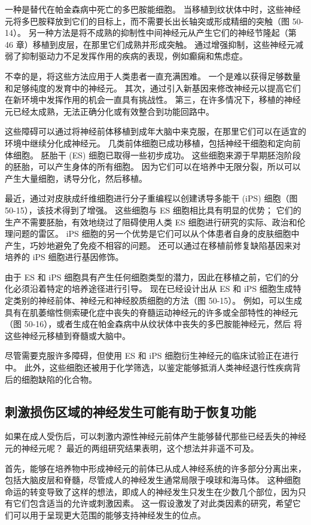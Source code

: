 一种是替代在帕金森病中死亡的多巴胺能细胞。 当移植到纹状体中时，这些神经元将多巴胺释放到它们的目标上，而不需要长出长轴突或形成精细的突触（图 50-14）。 另一种方法是将不成熟的抑制性中间神经元从产生它们的神经节隆起（第 46 章）移植到皮层，在那里它们成熟并形成突触。 通过增强抑制，这些神经元减弱了抑制驱动力不足发挥作用的疾病的表现，例如癫痫和焦虑症。

不幸的是，将这些方法应用于人类患者一直充满困难。 一个是难以获得足够数量和足够纯度的发育中的神经元。 其次，通过引入新基因来修改神经元以提高它们在新环境中发挥作用的机会一直具有挑战性。 第三，在许多情况下，移植的神经元已经太成熟，无法正确分化或有效整合到功能回路中。

这些障碍可以通过将神经前体移植到成年大脑中来克服，在那里它们可以在适宜的环境中继续分化成神经元。 几类前体细胞已成功移植，包括神经干细胞和定向前体细胞。 胚胎干 (ES) 细胞已取得一些初步成功。 这些细胞来源于早期胚泡阶段的胚胎，可以产生身体的所有细胞。 因为它们可以在培养中无限分裂，所以可以产生大量细胞，诱导分化，然后移植。

最近，通过对皮肤成纤维细胞进行分子重编程以创建诱导多能干 (iPS) 细胞（图 50-15），该技术得到了增强。 这些细胞与 ES 细胞相比具有明显的优势； 它们的生产不需要胚胎，有效地绕过了阻碍使用人类 ES 细胞进行研究的实际、政治和伦理问题的雷区。 iPS 细胞的另一个优势是它们可以从个体患者自身的皮肤细胞中产生，巧妙地避免了免疫不相容的问题。 还可以通过在移植前修复缺陷基因来对培养的 iPS 细胞进行基因修饰。

由于 ES 和 iPS 细胞具有产生任何细胞类型的潜力，因此在移植之前，它们的分化必须沿着特定的培养途径进行引导。 现在已经设计出从 ES 和 iPS 细胞生成特定类别的神经前体、神经元和神经胶质细胞的方法（图 50-15）。 例如，可以生成具有在肌萎缩性侧索硬化症中丧失的脊髓运动神经元的许多或全部特性的神经元（图 50-16），或者生成在帕金森病中从纹状体中丧失的多巴胺能神经元，然后 将这些神经元移植到脊髓或大脑中。

尽管需要克服许多障碍，但使用 ES 和 iPS 细胞衍生神经元的临床试验正在进行中。 此外，这些细胞还被用于化学筛选，以鉴定能够抵消人类神经退行性疾病背后的细胞缺陷的化合物。

\subsection{刺激损伤区域的神经发生可能有助于恢复功能}
如果在成人受伤后，可以刺激内源性神经元前体产生能够替代那些已经丢失的神经元的神经元呢？ 最近的两组研究结果表明，这个想法并非遥不可及。

首先，能够在培养物中形成神经元的前体已从成人神经系统的许多部分分离出来，包括大脑皮层和脊髓，尽管成人的神经发生通常局限于嗅球和海马体。 这种细胞命运的转变导致了这样的想法，即成人的神经发生只发生在少数几个部位，因为只有它们包含适当的允许或刺激因素。 这一假设激发了对此类因素的研究，希望它们可以用于呈现更大范围的能够支持神经发生的位点。

